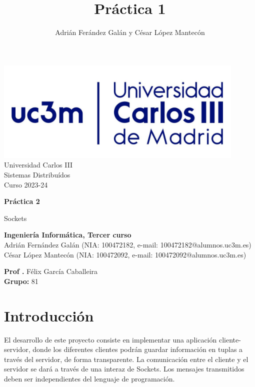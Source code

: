 \documentclass[]{article}
\title{Práctica 1}
\author{Adrián Ferández Galán y César López Mantecón}
\begin{document}
\begin{titlepage}
    \centering
   \includegraphics[width=0.9\textwidth]{uc3m.jpg} 
    {\Huge Universidad Carlos III\\
    
     \Large Sistemas Distribuídos\\
     \vspace{0.5cm}
     Curso 2023-24}
    \vspace{2cm}

    {\Huge \textbf{Práctica 2} \par}
    \vspace{0.5cm}
    {\Large Sockets \par}
    \vspace{8cm}

   \textbf{Ingeniería Informática, Tercer curso}\\
    \vspace{0.2cm} 
    Adrián Fernández Galán (NIA: 100472182, e-mail: 100472182@alumnos.uc3m.es) \\
    César López Mantecón   (NIA: 100472092, e-mail: 100472092@alumnos.uc3m.es)
    \vspace{0.5cm}

   
    \textbf{Prof .} Félix García Caballeira\\
    \textbf{Grupo: } 81   
    
\end{titlepage}
\newpage

\renewcommand{\contentsname}{\centering Índice}
\tableofcontents

\newpage

\section{Introducción}
\label{sec:introduccion}
El desarrollo de este proyecto consiste en implementar una aplicación cliente-servidor, donde los diferentes clientes podrán guardar información en tuplas a través del servidor, de forma transparente. La comunicación entre el cliente y el servidor se dará a través de una interaz de Sockets. Los mensajes transmitidos deben ser independientes del lenguaje de programación. 
\end{document}
